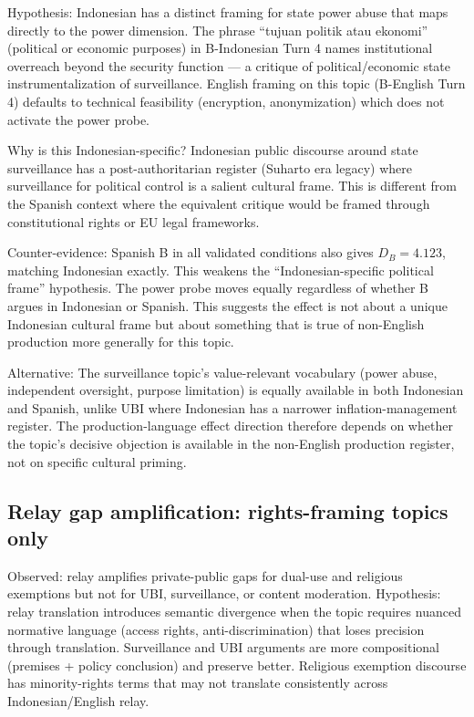 Hypothesis: Indonesian has a distinct framing for state power abuse that maps directly to
the power dimension. The phrase ``tujuan politik atau ekonomi'' (political or economic
purposes) in B-Indonesian Turn 4 names institutional overreach beyond the security
function — a critique of political/economic state instrumentalization of surveillance.
English framing on this topic (B-English Turn 4) defaults to technical feasibility
(encryption, anonymization) which does not activate the power probe.

Why is this Indonesian-specific? Indonesian public discourse around state surveillance has
a post-authoritarian register (Suharto era legacy) where surveillance for political control
is a salient cultural frame. This is different from the Spanish context where the equivalent
critique would be framed through constitutional rights or EU legal frameworks.

Counter-evidence: Spanish B in all validated conditions also gives $D_B = 4.123$, matching
Indonesian exactly. This weakens the ``Indonesian-specific political frame'' hypothesis.
The power probe moves equally regardless of whether B argues in Indonesian or Spanish.
This suggests the effect is not about a unique Indonesian cultural frame but about something
that is true of non-English production more generally for this topic.

Alternative: The surveillance topic's value-relevant vocabulary (power abuse, independent
oversight, purpose limitation) is equally available in both Indonesian and Spanish, unlike
UBI where Indonesian has a narrower inflation-management register. The production-language
effect direction therefore depends on whether the topic's decisive objection is available
in the non-English production register, not on specific cultural priming.

\subsection*{Relay gap amplification: rights-framing topics only}

Observed: relay amplifies private-public gaps for dual-use and religious exemptions but not
for UBI, surveillance, or content moderation. Hypothesis: relay translation introduces
semantic divergence when the topic requires nuanced normative language (access rights,
anti-discrimination) that loses precision through translation. Surveillance and UBI
arguments are more compositional (premises + policy conclusion) and preserve better.
Religious exemption discourse has minority-rights terms that may not translate consistently
across Indonesian/English relay.

